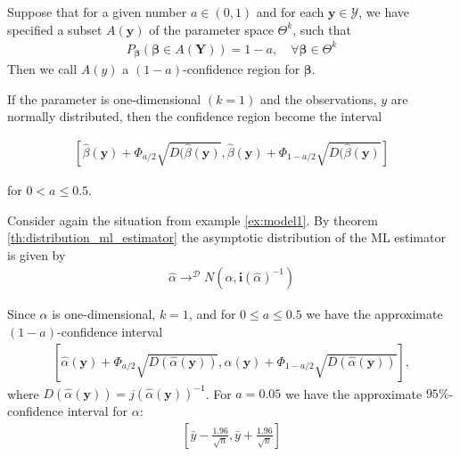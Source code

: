 \begin{definition} 
\label{def:confidence_region}
Suppose that for a given number $a \in (0,1)$ and for each $\textbf{y} \in \mathcal{Y}$, we have specified a subset $A(\textbf{y})$ of the parameter space $\Theta^k$, such that
\begin{align*}
    P_{\boldsymbol{\beta}} (\boldsymbol{\beta} \in A(\textbf{Y})) = 1 - a, \quad \forall \boldsymbol{\beta} \in \Theta^k
\end{align*}
Then we call $A(y)$ a $(1-a)$-confidence region for $\boldsymbol{\beta}$.
\end{definition}

If the parameter is one-dimensional $(k=1)$ and the observations, $y$ are normally distributed, then the confidence region become the interval

\begin{align*}
    \left[ 
    \hat{\beta}(\textbf{y}) + \Phi_{a/2} \sqrt{D(\hat{\beta}(\textbf{y})} , \hat{\beta}(\textbf{y}) + \Phi_{1 - a/2} \sqrt{D(\hat{\beta}(\textbf{y})}
    \right]
\end{align*}

for $0 < a \leq 0.5$. 


\begin{example}
Consider again the situation from example \ref{ex:model1}. By theorem \ref{th:distribution_ml_estimator} the asymptotic distribution of the ML estimator is given by
\begin{align*}
    \hat{\alpha} \rightarrow^\mathcal{D} N\left( \alpha, \boldsymbol{i}(\hat{\alpha})^{-1} \right)
\end{align*}

Since $\alpha$ is one-dimensional, $k=1$, and for $0\leq a \leq 0.5$ we have the approximate $(1-a)$-confidence interval
\begin{align*}
\left[ \hat{\alpha}(\mathbf{y}) + \Phi_{a/2} \sqrt{D\left( \hat{\alpha}\left(\mathbf{y}\right)\right)}, \hat{\alpha}(\mathbf{y}) + \Phi_{1 - a/2} \sqrt{D\left( \hat{\alpha}\left(\mathbf{y}\right)\right)} \right],
\end{align*}
where $D\left(\hat{\alpha}(\mathbf{y})\right) = j\left(\hat{\alpha}(\mathbf{y})\right)^{-1}$.
For $a=0.05$ we have the approximate $95\%$-confidence interval for $\alpha$:
\begin{align*}
\left[ \bar{y} - \frac{1.96}{\sqrt{n}}, \bar{y} + \frac{1.96}{\sqrt{n}} \right]    
\end{align*}
\end{example}


